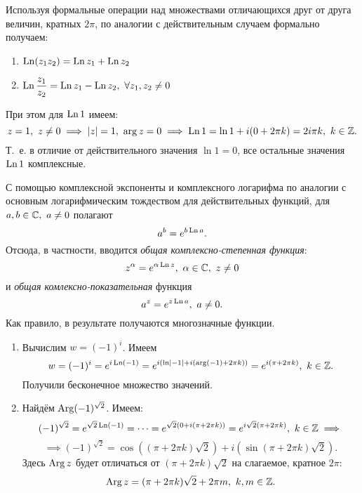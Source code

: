\documentclass[../../main.tex]{subfiles}
\begin{document}
Используя формальные операции над множествами отличающихся друг от друга
величин, кратных $ 2\pi $, по аналогии с действительным случаем 
формально
получаем:
\begin{enumerate}
	\item $\operatorname{Ln}(z_1z_2) = \operatorname{Ln} z_1 + \operatorname{Ln} z_2$
	\item $\operatorname{Ln} \dfrac{z_1}{z_2} = \operatorname{Ln} z_1 - \operatorname{Ln} z_2,\ \forall z_1, z_2 \neq 0$
\end{enumerate}
При этом для $ \operatorname{Ln} 1 $ имеем:
\[z = 1,\ z \neq 0 \implies |z| = 1,\ \arg z = 0 \implies 
\Ln 1 = \ln 1 + i(0 + 2\pi k) = 2i\pi k,\ 
k\in\Z.\]
Т.~е. в отличие от действительного значения $ \ln 1 = 0 $, все остальные 
значения $\operatorname{Ln} 1$ комплексные.

С помощью комплексной экспоненты и комплексного логарифма по аналогии с 
основным
логарифмическим тождеством для действительных функций, для 
$ a, b \in \mathbb{C},\ a \neq 0 $ полагают 
\begin{equation}
\label{lec27:20}
a^b = e^{b \operatorname{Ln} a}.
\end{equation}
Отсюда, в частности, вводится \emph{общая комплексно-степенная функция}:
\begin{equation}
\label{lec27:21}
z^\alpha = e ^{\alpha \operatorname{Ln} z},\ \alpha \in \mathbb{C},\ z \neq 0
\end{equation}
и \emph{общая комлексно-показательная} функция 
\begin{equation}
\label{lec27:22}
a^z = e^{z \operatorname{Ln} a},\ a \neq 0.
\end{equation}
Как правило, в результате получаются многозначные функции.
\begin{exmps}

\;

\begin{enumerate}
\item  Вычислим $ w = (-1)^i $.
Имеем \[
w = (-1)^i = e^{i \operatorname{Ln}(-1)} = 
e^{i(\ln \left|{-1}\right| + i(\arg(-1) + 2\pi k))} = 
e^{i(\pi + 2\pi k)},\ k \in \mathbb{Z}.
\]
Получили бесконечное множество значений.
\item Найдём $ \operatorname{Arg}(-1)^{\sqrt{2}} $. Имеем: \[
(-1)^{\sqrt{2}} = e^{\sqrt{2} \operatorname{Ln}(-1)} = \dots =
e^{\sqrt{2}(0 + i(\pi + 2\pi k))} = 
e^{i\sqrt{2}(\pi + 2\pi k)},\ k \in \mathbb{Z} \implies\]
\[\implies (-1)^{\sqrt{2}} = 
\cos ((\pi + 2\pi k)\sqrt{2}) + i(\sin(\pi + 2\pi k)\sqrt{2}).
\]
Здесь $ \operatorname{Arg} z $ будет отличаться от $ (\pi + 2\pi k)\sqrt{2} $ на слагаемое, 
кратное $ 2\pi $:
\[
\Arg z = (\pi + 2\pi k)\sqrt{2} + 2\pi m,\ k, m \in \Z.
\]
\end{enumerate}
\end{exmps}
\end{document}
